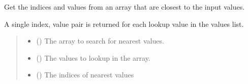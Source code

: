 \documentclass[letterpaper,10pt,english]{sphinxmanual}
\begin{document}
\begin{fulllineitems}
\begin{quote}
\begin{description}
\begin{itemize}
\end{itemize}

\sphinxAtStartPar
{}

\end{description}\end{quote}

\end{fulllineitems}


\begin{fulllineitems}
\label{\detokenize{misc:glomar_gridding.utils.find_nearest}}
\pysigstartsignatures
\pysiglinewithargsret
{}
{\sphinxparamcomma {}}
{}
\pysigstopsignatures
\sphinxAtStartPar
Get the indices and values from an array that are closest to the input
values.

\sphinxAtStartPar
A single index, value pair is returned for each look\sphinxhyphen{}up value in the values
list.
\begin{quote}\begin{description}
\begin{itemize}
\item {}
\sphinxAtStartPar
{} () \textendash{} The array to search for nearest values.

\item {}
\sphinxAtStartPar
{} () \textendash{} The values to look\sphinxhyphen{}up in the array.

\end{itemize}

\sphinxAtStartPar
{}

\sphinxAtStartPar
\begin{itemize}
\item {}
\sphinxAtStartPar
{} () \textendash{} The indices of nearest values


\end{itemize}
\end{description}
\end{quote}
\end{fulllineitems}
\end{document}
